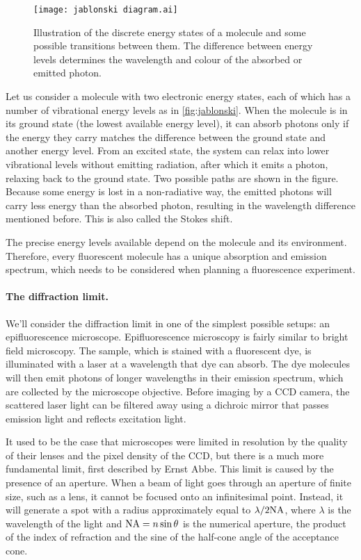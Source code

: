 \begin{figure}
	\centering
	\texttt{[image: jablonski diagram.ai]}
	\caption{
		Illustration of the discrete energy states of a molecule and some possible transitions between them. The difference between energy levels determines the wavelength and colour of the absorbed or emitted photon.
	}
	\label{fig:jablonski}
\end{figure}

Let us consider a molecule with two electronic energy states, each of which has a number of vibrational energy levels as in \autoref{fig:jablonski}. When the molecule is in its ground state (the lowest available energy level), it can absorb photons only if the energy they carry matches the difference between the ground state and another energy level. From an excited state, the system can relax into lower vibrational levels without emitting radiation, after which it emits a photon, relaxing back to the ground state. Two possible paths are shown in the figure. Because some energy is lost in a non-radiative way, the emitted photons will carry less energy than the absorbed photon, resulting in the wavelength difference mentioned before. This is also called the Stokes shift. 

The precise energy levels available depend on the molecule and its environment. Therefore, every fluorescent molecule has a unique absorption and emission spectrum, which needs to be considered when planning a fluorescence experiment.

\paragraph{The diffraction limit.} We'll consider the diffraction limit in one of the simplest possible setups: an epifluorescence microscope. Epifluorescence microscopy is fairly similar to bright field microscopy. The sample, which is stained with a fluorescent dye, is illuminated with a laser at a wavelength that dye can absorb. The dye molecules will then emit photons of longer wavelengths in their emission spectrum, which are collected by the microscope objective. Before imaging by a CCD camera, the scattered laser light can be filtered away using a dichroic mirror that passes emission light and reflects excitation light. 

It used to be the case that microscopes were limited in resolution by the quality of their lenses and the pixel density of the CCD, but there is a much more fundamental limit, first described by Ernst Abbe. This limit is caused by the presence of an aperture. When a beam of light goes through an aperture of finite size, such as a lens, it cannot be focused onto an infinitesimal point. Instead, it will generate a spot with a radius approximately equal to $ \lambda/2\mathrm{NA} $, where $ \lambda $ is the wavelength of the light and $ \mathrm{NA}= n\sin\theta $ is the numerical aperture, the product of the index of refraction and the sine of the half-cone angle of the acceptance cone.

